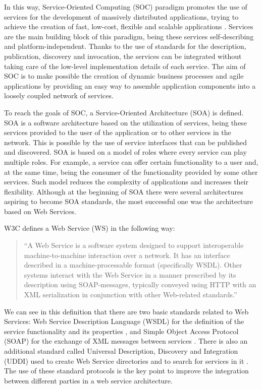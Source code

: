 In this way, Service-Oriented Computing (SOC) paradigm promotes the use of services 
for the development of massively distributed applications, trying to achieve the creation of fast, 
low-cost, flexible and scalable applications \cite{Papazoglou2007}. 
Services are the main building block of this paradigm, being these services self-describing and platform-independent. 
Thanks to the use of standards for the description, publication, discovery and invocation, 
the services can be integrated without taking care of the low-level implementation 
details of each service. The aim of SOC is to make possible 
the creation of dynamic business processes and agile applications 
by providing an easy way to assemble application components into a loosely coupled network of services.

To reach the goals of SOC, a Service-Oriented Architecture (SOA) is defined. 
SOA is a software architecture based on the utilization of services, 
being these services provided to the user of the application or to other services in the network. 
This is possible by the use of service interfaces that can be published and discovered. 
SOA is based on a model of roles where every service can play multiple roles. 
For example, a service can offer certain functionality to a user and, at the same time, 
being the consumer of the functionality provided by some other services. 
Such model reduces the complexity of applications and increases their flexibility. 
Although at the beginning of SOA there were several architectures aspiring 
to become SOA standards, the most successful one was the architecture based on Web Services.

W3C defines a Web Service (WS) in the following way:

\begin{quotation}
	``A Web Service is a software system designed to support interoperable machine-to-machine interaction over a network. It has
an interface described in a machine-processable format (specifically WSDL). Other systems interact with the Web Service in a manner prescribed by its description using SOAP-messages, typically conveyed using HTTP with an XML serialization in conjunction with other Web-related standards.''
\end{quotation}

We can see in this definition that there are two basic standards 
related to Web Services: Web Service Description Language (WSDL) for the definition 
of the service functionality and its properties \cite{wsdl}, 
and Simple Object Access Protocol (SOAP) for the exchange of 
XML messages between services \cite{SOAP}. 
There is also an additional standard called Universal Description, Discovery and Integration (UDDI) 
used to create Web Service directories and to search for services 
in it \cite{UDDI}. The use of these standard protocols is 
the key point to improve the integration between different parties in a web service architecture.


